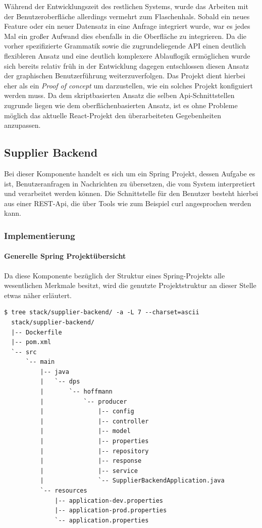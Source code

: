 Während der Entwicklungszeit des restlichen Systems, wurde das Arbeiten mit der Benutzeroberfläche allerdings vermehrt zum Flaschenhals. Sobald ein neues Feature oder ein neuer Datensatz in eine Anfrage integriert wurde, war es jedes Mal ein großer Aufwand dies ebenfalls in die Oberfläche zu integrieren. Da die vorher spezifizierte Grammatik sowie die zugrundeliegende API einen deutlich flexibleren Ansatz und eine deutlich komplexere Ablauflogik ermöglichen wurde sich bereits relativ früh in der Entwicklung dagegen entschlossen diesen Ansatz der graphischen Benutzerführung weiterzuverfolgen. Das Projekt dient hierbei eher als ein \emph{Proof of concept} um darzustellen, wie ein solches Projekt konfiguiert werden muss. Da dem skriptbasierten Ansatz die selben Api-Schnittstellen zugrunde liegen wie dem oberflächenbasierten Ansatz, ist es ohne Probleme möglich das aktuelle React-Projekt den überarbeiteten Gegebenheiten anzupassen. 



\subsection{Supplier Backend}
Bei dieser Komponente handelt es sich um ein Spring Projekt, dessen Aufgabe es ist, Benutzeranfragen in Nachrichten zu übersetzen, die vom System interpretiert und verarbeitet werden können. Die Schnittstelle für den Benutzer besteht hierbei aus einer REST-Api, die über Tools wie zum Beispiel curl angesprochen werden kann.


\subsubsection{Implementierung}

\paragraph{Generelle Spring Projektübersicht}
Da diese Komponente bezüglich der Struktur eines Spring-Projekts alle wesentlichen Merkmale besitzt, wird die genutzte Projektstruktur an dieser Stelle etwas näher erläutert. 

\label{verb:supplierStruct}
\begin{minipage}{\linewidth}
\begin{lstlisting}[caption={Supplier Backend - Struktur},style=bashStyle]
  $ tree stack/supplier-backend/ -a -L 7 --charset=ascii
  stack/supplier-backend/
  |-- Dockerfile
  |-- pom.xml
  `-- src
      `-- main
          |-- java
          |   `-- dps
          |       `-- hoffmann
          |           `-- producer
          |               |-- config
          |               |-- controller
          |               |-- model
          |               |-- properties
          |               |-- repository
          |               |-- response
          |               |-- service
          |               `-- SupplierBackendApplication.java
          `-- resources
              |-- application-dev.properties
              |-- application-prod.properties
              `-- application.properties
\end{lstlisting}
\end{minipage}

